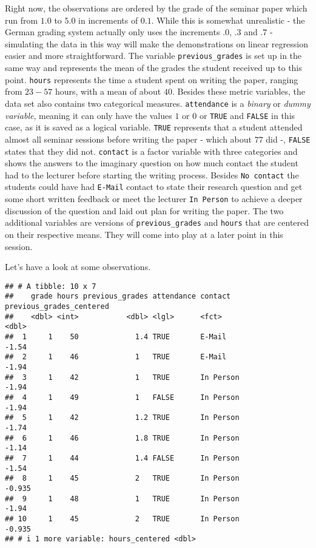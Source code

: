 \documentclass[
]{book}
\begin{document}
Right now, the observations are ordered by the grade of the seminar paper which
run from \(1.0\) to \(5.0\) in increments of \(0.1\). While this is somewhat
unrealistic - the German grading system actually only uses the increments \(.0\),
\(.3\) and \(.7\) - simulating the data in this way will make the demonstrations on
linear regression easier and more straightforward. The variable
\texttt{previous\_grades} is set up in the same way and represents the mean of the
grades the student received up to this point. \texttt{hours} represents the time a
student spent on writing the paper, ranging from \(23 - 57\) hours, with a mean of
about \(40\). Besides these metric variables, the data set also contains two
categorical measures. \texttt{attendance} is a \emph{binary} or \emph{dummy variable}, meaning it can only
have the values \(1\) or \(0\) or \texttt{TRUE} and \texttt{FALSE} in this case, as it is saved as
a logical variable. \texttt{TRUE} represents that a student attended almost all seminar
sessions before writing the paper - which about \(77%
\) did -, \texttt{FALSE} states that
they did not.
\texttt{contact} is a factor variable with three categories and shows the answers to
the imaginary question on how much contact the student had to the lecturer
before starting the writing process. Besides \texttt{No\ contact} the students could
have had \texttt{E-Mail} contact to state their research question and get some short
written feedback or meet the lecturer \texttt{In\ Person} to achieve a deeper discussion
of the question and laid out plan for writing the paper.
The two additional variables are versions of \texttt{previous\_grades} and \texttt{hours} that
are centered on their respective means. They will come into play at a later
point in this session.

Let's have a look at some observations.

\begin{verbatim}
## # A tibble: 10 x 7
##    grade hours previous_grades attendance contact   previous_grades_centered
##    <dbl> <int>           <dbl> <lgl>      <fct>                        <dbl>
##  1     1    50             1.4 TRUE       E-Mail                      -1.54 
##  2     1    46             1   TRUE       E-Mail                      -1.94 
##  3     1    42             1   TRUE       In Person                   -1.94 
##  4     1    49             1   FALSE      In Person                   -1.94 
##  5     1    42             1.2 TRUE       In Person                   -1.74 
##  6     1    46             1.8 TRUE       In Person                   -1.14 
##  7     1    44             1.4 FALSE      In Person                   -1.54 
##  8     1    45             2   TRUE       In Person                   -0.935
##  9     1    48             1   TRUE       In Person                   -1.94 
## 10     1    45             2   TRUE       In Person                   -0.935
## # i 1 more variable: hours_centered <dbl>
\end{verbatim}
\end{document}
